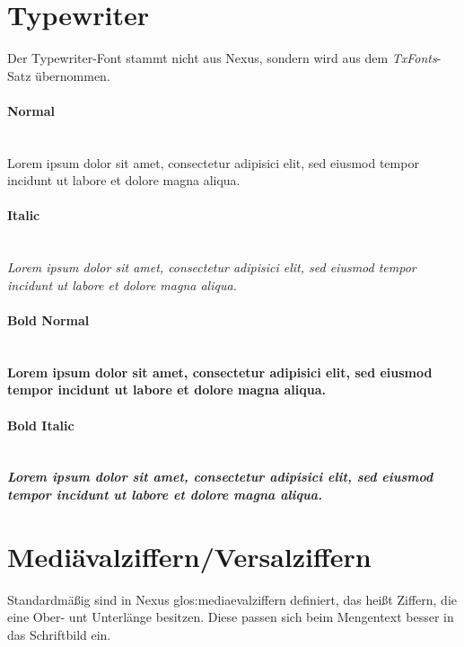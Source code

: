 \section*{Typewriter}

Der Typewriter-Font stammt nicht aus Nexus, sondern wird aus dem
\emph{TxFonts}-Satz übernommen.

\paragraph{Normal}\hfill\\
{\ttfamily
Lorem ipsum dolor sit amet, consectetur adipisici elit, sed eiusmod tempor
incidunt ut labore et dolore magna aliqua.
}

\paragraph{Italic}\hfill\\
{\ttfamily\itshape%
Lorem ipsum dolor sit amet, consectetur adipisici elit, sed eiusmod tempor
incidunt ut labore et dolore magna aliqua.
}


\paragraph{Bold Normal}\hfill\\
{\ttfamily\bfseries%
Lorem ipsum dolor sit amet, consectetur adipisici elit, sed eiusmod tempor
incidunt ut labore et dolore magna aliqua.
}

\paragraph{Bold Italic}\hfill\\
{\ttfamily\bfseries\itshape%
Lorem ipsum dolor sit amet, consectetur adipisici elit, sed eiusmod tempor
incidunt ut labore et dolore magna aliqua.
}


\section*{Mediävalziffern/Versalziffern}

Standardmäßig sind in Nexus \gls{glos:mediaevalziffern} definiert, das heißt Ziffern,
die eine Ober- unt Unterlänge besitzen.
Diese passen sich beim Mengentext besser in das Schriftbild ein.\par

